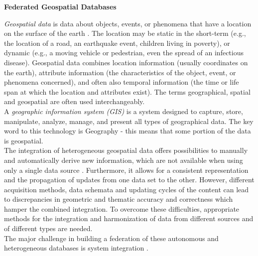 \documentclass[12pt,a4paper]{report}
\newcommand{\term}{\textit}
\newcommand{\acr}{\MakeUppercase}
\begin{document}
	\begin{titlepage}
		\begin{center}
			\thispagestyle{empty}
			\Large
			\textbf{Federated Geospatial Databases}
		\end{center}
	\end{titlepage}




	\term{Geospatial data} is data about objects, events, or phenomena that have 
	a location on the surface of the earth \citep{Stock}. The location may be 
	static in the short-term (e.g., the location of a road, an earthquake event, children living in poverty), or dynamic (e.g., a moving vehicle or pedestrian, even the spread of an infectious disease). Geospatial data combines location information (usually coordinates on the earth), attribute information (the characteristics of the object, event, or phenomena concerned), and often also temporal information (the time or life span at which the location and attributes exist). The terms geographical, spatial and geospatial are often used interchangeably.
	\\

	A \term{geographic information system (\acr{gis})} is a system designed to capture, store, manipulate, analyze, manage, and present all types of geographical data. The key word to this technology is Geography - this means that some portion of the data is geospatial.
	\\




	The integration of heterogeneous geospatial data offers possibilities to manually and automatically derive new information, which are not available when using only a single data source \citep{Butenuth}. Furthermore, it allows for a consistent representation and the propagation of updates from one data set to the other. However, different acquisition methods, data schemata and updating cycles of the content can lead to discrepancies in geometric and thematic accuracy and correctness which hamper the combined integration. To overcome these difficulties, appropriate methods for the integration and harmonization of data from different sources and of different types are needed.
	\\

	The major challenge in building a federation of these autonomous and heterogeneous databases is system integration \citep{Malik}.
	\\
\end{document}
